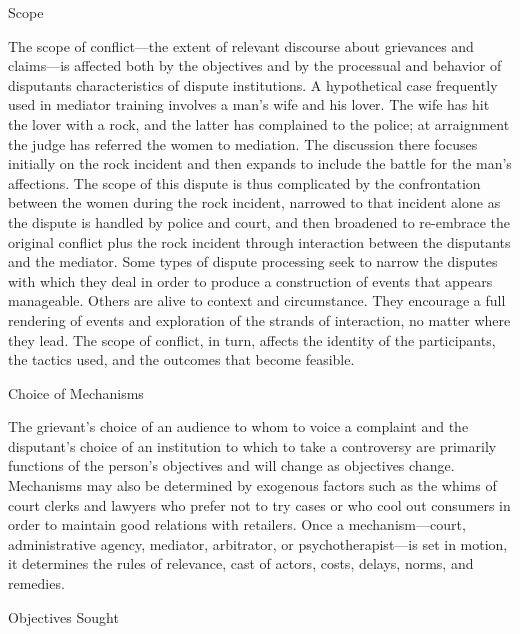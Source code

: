 \documentclass[11pt,letterpaper,twoside]{article}
\begin{document}
{Scope}

The scope of conflict---the extent of relevant discourse about
grievances and claims---is affected both by the objectives and by the
processual and behavior of disputants characteristics of dispute
institutions. A hypothetical case frequently used in mediator training
involves a man's wife and his lover. The wife has hit the lover with a
rock, and the latter has complained to the police; at arraignment the
judge has referred the women to mediation. The discussion there focuses
initially on the rock incident and then expands to include the battle
for the man's affections. The scope of this dispute is thus complicated
by the confrontation between the women during the rock incident,
narrowed to that incident alone as the dispute is handled by police and
court, and then broadened to re-embrace the original conflict plus the
rock incident through interaction between the disputants and the
mediator. Some types of dispute processing seek to narrow the disputes
with which they deal in order to produce a construction of events that
appears manageable. Others are alive to context and circumstance. They
encourage a full rendering of events and exploration of the strands of
interaction, no matter where they lead. The scope of conflict, in turn,
affects the identity of the participants, the tactics used, and the
outcomes that become feasible.

{Choice of Mechanisms}

The grievant's choice of an audience to whom to voice a complaint and
the disputant's choice of an institution to which to take a controversy
are primarily functions of the person's objectives and will change as
objectives change. Mechanisms may also be determined by exogenous
factors such as the whims of court clerks and lawyers who prefer not to
try cases or who cool out consumers in order to maintain good relations
with retailers. Once a mechanism---court, administrative agency,
mediator, arbitrator, or psychotherapist---is set in motion, it
determines the rules of relevance, cast of actors, costs, delays, norms,
and remedies.

{Objectives Sought}
\end{document}
